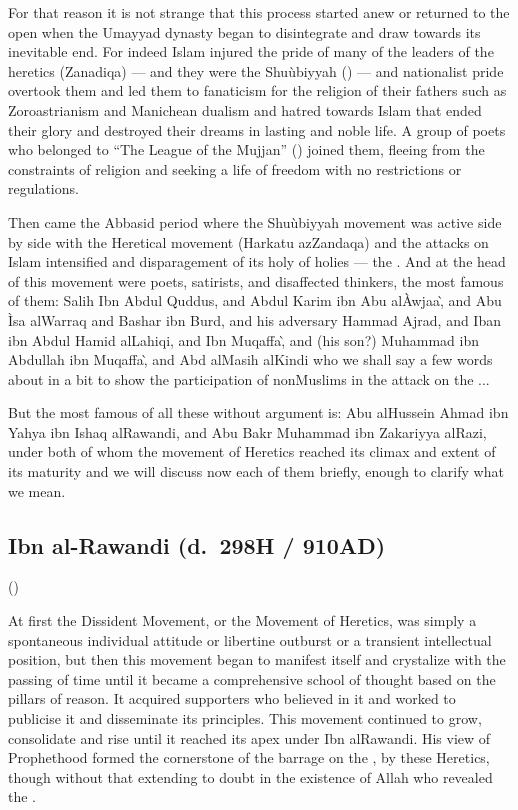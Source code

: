 \documentclass[12pt]{memoir}
\begin{document}
For that reason it is not strange that this process started anew or returned to
the open when the Umayyad dynasty began to disintegrate and draw towards its
inevitable end. For indeed Islam injured the pride of many of the leaders of
the heretics (Zanadiqa) — and they were the Shu\`ubiyyah
()
— and nationalist pride overtook them and led them to fanaticism for the
religion of their fathers such as Zoroastrianism and Manichean dualism and
hatred towards Islam that ended their glory and destroyed their dreams in
lasting and noble life.
A group of poets who belonged to “The League of the Mujjan”
()
joined them, fleeing from the constraints of religion
and seeking a life of freedom with no restrictions or regulations.

Then came the Abbasid period where the Shu\`ubiyyah movement was active side by
side with the Heretical movement (Harkatu az\–Zandaqa) and the attacks on Islam
intensified and disparagement of its holy of holies — the \Quran. And at the
head of this movement were poets, satirists, and disaffected thinkers, the most
famous of them: Salih Ibn Abdul Quddus, and Abdul Karim ibn Abu al\–\`Awjaa\`,
and Abu \`Isa al\–Warraq and Bashar ibn Burd,
and his adversary Hammad Ajrad, and
Iban ibn Abdul Hamid al\–Lahiqi, and Ibn Muqaffa\`,
and (his son?) Muhammad ibn Abdullah ibn Muqaffa\`,
and Abd al\–Masih al\–Kindi who we shall say a few words
about in a bit to show the participation of non\–Muslims in the attack on the
\Quran...

But the most famous of all these without argument is:
Abu al\–Hussein Ahmad ibn Yahya ibn Ishaq al\–Rawandi,
and Abu Bakr Muhammad ibn Zakariyya al\–Razi,
under both of whom the movement of Heretics reached its climax
and extent of its maturity and we will discuss now each of them briefly,
enough to clarify what we mean.


\subsection{Ibn al-Rawandi (d.\ 298H / 910AD)}

()

At first the Dissident Movement, or the Movement of Heretics, was simply a
spontaneous individual attitude or libertine outburst or a transient
intellectual position, but then this movement began to manifest itself and
crystalize with the passing of time until it became a comprehensive school of
thought based on the pillars of reason. It acquired supporters who believed in
it and worked to publicise it and disseminate its principles.
This movement continued to grow,
consolidate and rise until it reached its apex under Ibn al\–Rawandi.
His view of Prophethood formed the cornerstone of the barrage
on the \Quran, by these Heretics, though without that extending to doubt in the
existence of Allah who revealed the \Quran.
\end{document}
